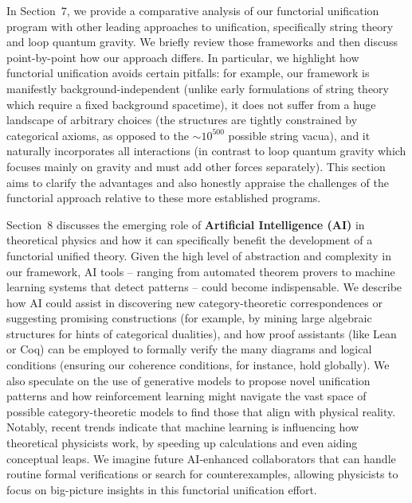 \vspace{0.5cm}

In Section~7, we provide a comparative analysis of our functorial unification program with other leading approaches to unification, specifically string theory and loop quantum gravity. We briefly review those frameworks and then discuss point-by-point how our approach differs. In particular, we highlight how functorial unification avoids certain pitfalls: for example, our framework is manifestly background-independent (unlike early formulations of string theory which require a fixed background spacetime), it does not suffer from a huge landscape of arbitrary choices (the structures are tightly constrained by categorical axioms, as opposed to the $\sim10^{500}$ possible string vacua), and it naturally incorporates all interactions (in contrast to loop quantum gravity which focuses mainly on gravity and must add other forces separately). This section aims to clarify the advantages and also honestly appraise the challenges of the functorial approach relative to these more established programs.

\vspace{0.5cm}

Section~8 discusses the emerging role of \textbf{Artificial Intelligence (AI)} in theoretical physics and how it can specifically benefit the development of a functorial unified theory. Given the high level of abstraction and complexity in our framework, AI tools -- ranging from automated theorem provers to machine learning systems that detect patterns -- could become indispensable. We describe how AI could assist in discovering new category-theoretic correspondences or suggesting promising constructions (for example, by mining large algebraic structures for hints of categorical dualities), and how proof assistants (like Lean or Coq) can be employed to formally verify the many diagrams and logical conditions (ensuring our coherence conditions, for instance, hold globally). We also speculate on the use of generative models to propose novel unification patterns and how reinforcement learning might navigate the vast space of possible category-theoretic models to find those that align with physical reality. Notably, recent trends indicate that machine learning is influencing how theoretical physicists work, by speeding up calculations and even aiding conceptual leaps. We imagine future AI-enhanced collaborators that can handle routine formal verifications or search for counterexamples, allowing physicists to focus on big-picture insights in this functorial unification effort.

